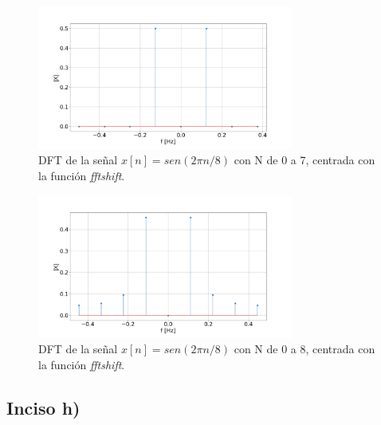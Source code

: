 \documentclass{article}
\begin{document}
\begin{figure}[H]
\centering
\includegraphics[width=0.75\textwidth]{Img/punto_1_g_a.png}
\caption{DFT de la señal $x[n]=sen(2 \pi n /8)$ con N de 0 a 7, centrada con la función \textit{fftshift}.}
\label{fig.1g}
\end{figure}

\begin{figure}[H]
\centering
\includegraphics[width=0.75\textwidth]{Img/punto_1_g_b.png}
\caption{DFT de la señal $x[n]=sen(2 \pi n /8)$ con N de 0 a 8, centrada con la función \textit{fftshift}.}
\label{fig.2g}
\end{figure}



\subsection*{Inciso h)}
\end{document}
